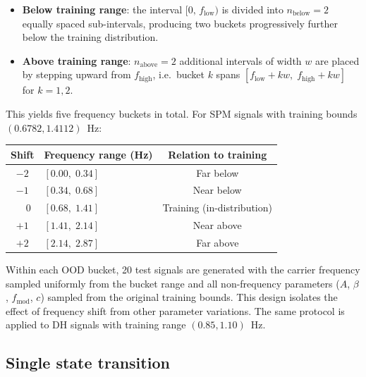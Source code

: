 \documentclass[11pt]{article}
\begin{document}
\begin{itemize}
    \item \textbf{Below training range}: the interval $[0,\, f_{\mathrm{low}})$ is divided into $n_{\mathrm{below}} = 2$ equally spaced sub-intervals, producing two buckets progressively further below the training distribution.
    \item \textbf{Above training range}: $n_{\mathrm{above}} = 2$ additional intervals of width $w$ are placed by stepping upward from $f_{\mathrm{high}}$, i.e.\ bucket $k$ spans $[f_{\mathrm{low}} + kw,\; f_{\mathrm{high}} + kw]$ for $k = 1, 2$.
\end{itemize}

This yields five frequency buckets in total. For SPM signals with training bounds $(0.6782, 1.4112)$~Hz:
\begin{center}
\begin{tabular}{@{}clc@{}}
\toprule
\textbf{Shift} & \textbf{Frequency range (Hz)} & \textbf{Relation to training} \\
\midrule
$-2$ & $[0.00,\; 0.34]$  & Far below  \\
$-1$ & $[0.34,\; 0.68]$  & Near below \\
$\phantom{+}0$  & $[0.68,\; 1.41]$  & Training (in-distribution) \\
$+1$ & $[1.41,\; 2.14]$  & Near above \\
$+2$ & $[2.14,\; 2.87]$  & Far above  \\
\bottomrule
\end{tabular}
\end{center}

Within each OOD bucket, 20 test signals are generated with the carrier frequency sampled uniformly from the bucket range and all non-frequency parameters ($A$, $\beta$, $f_{\mathrm{mod}}$, $c$) sampled from the original training bounds. This design isolates the effect of frequency shift from other parameter variations. The same protocol is applied to DH signals with training range $(0.85, 1.10)$~Hz.

\subsection{Single state transition}
\label{sec:single_cp}
\end{document}
